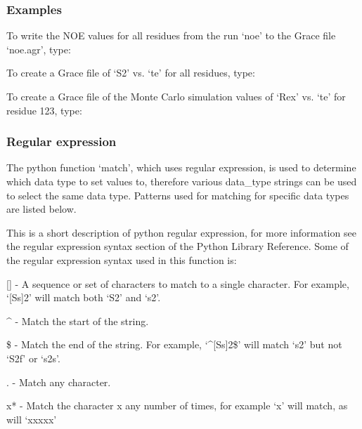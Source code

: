\subsubsection{Examples}

To write the NOE values for all residues from the run `noe' to the Grace file `noe.agr',
type:



To create a Grace file of `S2' vs. `te' for all residues, type:




To create a Grace file of the Monte Carlo simulation values of `Rex' vs. `te' for residue
123, type:






\subsubsection{Regular expression}

The python function `match', which uses regular expression, is used to determine which data
type to set values to, therefore various data\_type strings can be used to select the same
data type.  Patterns used for matching for specific data types are listed below.

This is a short description of python regular expression, for more information see the
regular expression syntax section of the Python Library Reference.  Some of the regular
expression syntax used in this function is:

    [] - A sequence or set of characters to match to a single character.  For example,
    `[Ss]2' will match both `S2' and `s2'.

    \^{} - Match the start of the string.

    \$ - Match the end of the string.  For example, `\^{}[Ss]2\$' will match `s2' but not `S2f'
    or `s2s'.

    . - Match any character.

    x* - Match the character x any number of times, for example `x' will match, as will
    `xxxxx'

